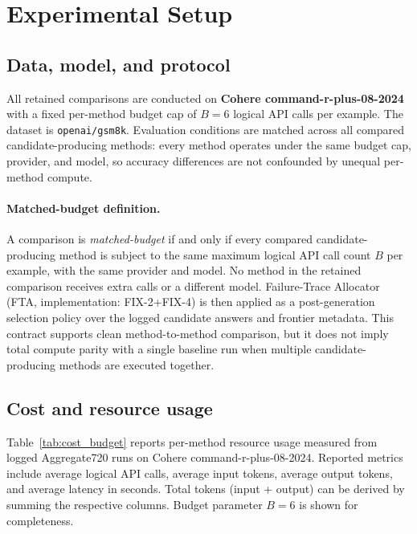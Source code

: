 \section{Experimental Setup}
\label{sec:experiments}

\subsection{Data, model, and protocol}
All retained comparisons are conducted on \textbf{Cohere command-r-plus-08-2024} with a fixed per-method budget cap of $B = 6$ logical API calls per example.  The dataset is \texttt{openai/gsm8k}.  Evaluation conditions are matched across all compared candidate-producing methods: every method operates under the same budget cap, provider, and model, so accuracy differences are not confounded by unequal per-method compute.

\paragraph{Matched-budget definition.} A comparison is \emph{matched-budget} if and only if every compared candidate-producing method is subject to the same maximum logical API call count $B$ per example, with the same provider and model.  No method in the retained comparison receives extra calls or a different model.  Failure-Trace Allocator (FTA, implementation: FIX-2+FIX-4) is then applied as a post-generation selection policy over the logged candidate answers and frontier metadata.
This contract supports clean method-to-method comparison, but it does not imply total compute parity with a single baseline run when multiple candidate-producing methods are executed together.

\subsection{Cost and resource usage}
\label{sec:cost}

Table~\ref{tab:cost_budget} reports per-method resource usage measured from logged Aggregate720 runs on Cohere command-r-plus-08-2024. Reported metrics include average logical API calls, average input tokens, average output tokens, and average latency in seconds.  Total tokens (input + output) can be derived by summing the respective columns.  Budget parameter $B = 6$ is shown for completeness.

